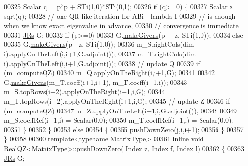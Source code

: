 \begin{DoxyCode}
00325         Scalar q = p*p + STi(1,0)*STi(0,1);
00326         \textcolor{keywordflow}{if} (q>=0) \{
00327           Scalar z = sqrt(q);
00328           \textcolor{comment}{// one QR-like iteration for ABi - lambda I}
00329           \textcolor{comment}{// is enough - when we know exact eigenvalue in advance,}
00330           \textcolor{comment}{// convergence is immediate}
00331           \hyperlink{group___jacobi___module_class_eigen_1_1_jacobi_rotation}{JRs} G;
00332           \textcolor{keywordflow}{if} (p>=0)
00333             G.\hyperlink{group___jacobi___module_af73c81e9cc139b7e0d877ce553b02ec0}{makeGivens}(p + z, STi(1,0));
00334           \textcolor{keywordflow}{else}
00335             G.\hyperlink{group___jacobi___module_af73c81e9cc139b7e0d877ce553b02ec0}{makeGivens}(p - z, STi(1,0));
00336           m\_S.rightCols(dim-i).applyOnTheLeft(i,i+1,G.\hyperlink{group___jacobi___module_a89c8ea615f8fa77ddd5810a1e5fde4da}{adjoint}());
00337           m\_T.rightCols(dim-i).applyOnTheLeft(i,i+1,G.\hyperlink{group___jacobi___module_a89c8ea615f8fa77ddd5810a1e5fde4da}{adjoint}());
00338           \textcolor{comment}{// update Q}
00339           \textcolor{keywordflow}{if} (m\_computeQZ)
00340             m\_Q.applyOnTheRight(i,i+1,G);
00341 
00342           G.\hyperlink{group___jacobi___module_af73c81e9cc139b7e0d877ce553b02ec0}{makeGivens}(m\_T.coeff(i+1,i+1), m\_T.coeff(i+1,i));
00343           m\_S.topRows(i+2).applyOnTheRight(i+1,i,G);
00344           m\_T.topRows(i+2).applyOnTheRight(i+1,i,G);
00345           \textcolor{comment}{// update Z}
00346           \textcolor{keywordflow}{if} (m\_computeQZ)
00347             m\_Z.applyOnTheLeft(i+1,i,G.\hyperlink{group___jacobi___module_a89c8ea615f8fa77ddd5810a1e5fde4da}{adjoint}());
00348 
00349           m\_S.coeffRef(i+1,i) = Scalar(0.0);
00350           m\_T.coeffRef(i+1,i) = Scalar(0.0);
00351         \}
00352       \}
00353       \textcolor{keywordflow}{else}
00354       \{
00355         pushDownZero(j,i,i+1);
00356       \}
00357     \}
00358 
00360   \textcolor{keyword}{template}<\textcolor{keyword}{typename} MatrixType>
00361     \textcolor{keyword}{inline} \textcolor{keywordtype}{void} \hyperlink{group___eigenvalues___module_class_eigen_1_1_real_q_z}{RealQZ<MatrixType>::pushDownZero}(
      \hyperlink{group___eigenvalues___module_a6201e534e901b5f4e66f72c176b534a3}{Index} z, \hyperlink{group___eigenvalues___module_a6201e534e901b5f4e66f72c176b534a3}{Index} f, \hyperlink{group___eigenvalues___module_a6201e534e901b5f4e66f72c176b534a3}{Index} l)
00362     \{
00363       \hyperlink{group___jacobi___module_class_eigen_1_1_jacobi_rotation}{JRs} G;

\end{DoxyCode}
